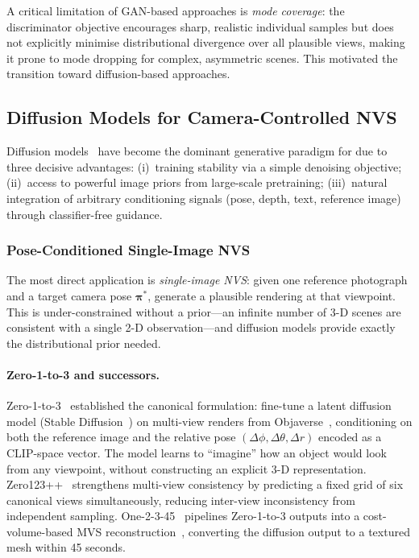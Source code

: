 A critical limitation of GAN-based approaches is \emph{mode coverage}: the
discriminator objective encourages sharp, realistic individual samples but does
not explicitly minimise distributional divergence over all plausible views,
making it prone to mode dropping for complex, asymmetric scenes.
This motivated the transition toward diffusion-based approaches.

\subsection{Diffusion Models for Camera-Controlled NVS}
\label{sec:diffusion_nvs}

Diffusion models~\citep{rombach2022ldm,ho2020ddpm} have become the
dominant generative paradigm for \nvs{} due to three decisive advantages:
(i)~training stability via a simple denoising objective;
(ii)~access to powerful image priors from large-scale pretraining;
(iii)~natural integration of arbitrary conditioning signals (pose, depth,
text, reference image) through classifier-free guidance.

\subsubsection{Pose-Conditioned Single-Image NVS}

The most direct application is \emph{single-image NVS}: given one reference
photograph and a target camera pose $\boldsymbol{\pi}^*$, generate a plausible
rendering at that viewpoint.
This is under-constrained without a prior---an infinite number of 3-D scenes
are consistent with a single 2-D observation---and diffusion models provide
exactly the distributional prior needed.

\paragraph{Zero-1-to-3 and successors.}
Zero-1-to-3~\citep{liu2023zero1to3} established the canonical formulation:
fine-tune a latent diffusion model (Stable Diffusion~\citep{rombach2022ldm})
on multi-view renders from Objaverse~\citep{deitke2023objaverse}, conditioning
on both the reference image and the relative pose $(\Delta\phi, \Delta\theta,
\Delta r)$ encoded as a CLIP-space vector.
The model learns to ``imagine'' how an object would look from any viewpoint,
without constructing an explicit 3-D representation.
Zero123++~\citep{shi2023zero123pp} strengthens multi-view consistency by
predicting a fixed grid of six canonical views simultaneously, reducing
inter-view inconsistency from independent sampling.
One-2-3-45~\citep{liu2023one2345} pipelines Zero-1-to-3 outputs into a
cost-volume-based MVS reconstruction~\citep{yao2018mvsnet}, converting the
diffusion output to a textured mesh within 45 seconds.

